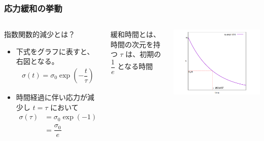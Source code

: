 \documentclass[12pt, dvipdfmx]{beamer}
\begin{document}
\begin{frame}
	\frametitle{応力緩和の挙動}
		\begin{columns}[T, onlytextwidth]
				\begin{exampleblock}{指数関数的減少とは？}
					\begin{itemize}
						\item 下式をグラフに表すと、右図となる。
						\begin{align*}
							\sigma(t) = \sigma_0 \exp \left(-\dfrac{t}{\tau} \right)
						\end{align*}
						\item 時間経過に伴い応力が減少し $t = \tau$ において
						\begin{align*}
							\sigma(\tau) 
							&= \sigma_0 \exp(-1)\\ 
							&= \dfrac{\sigma_0}{e}
						\end{align*}
					\end{itemize}
				\end{exampleblock}
				\begin{alertblock}{緩和時間とは、}
					時間の次元を持つ $\tau$ は、初期の $\dfrac{1}{e}$ となる時間
				\end{alertblock}
				\begin{center}
					\includegraphics[width=\textwidth]{relux_3.png}
				\end{center}
		\end{columns}
\end{frame}
\end{document}
